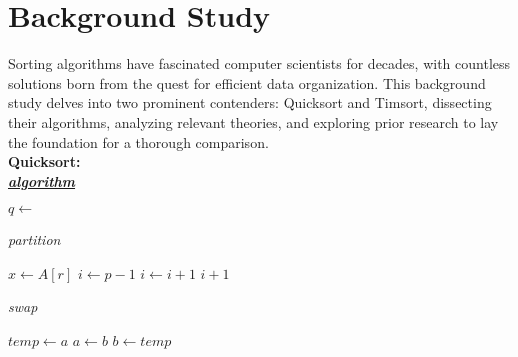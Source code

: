 \documentclass[a4paper,10pt,twocolumn]{article}
\begin{document}
\section{Background Study}
Sorting algorithms have fascinated computer scientists for decades, with countless solutions born from the quest for efficient data organization. This background study delves into two prominent contenders: Quicksort and Timsort, dissecting their algorithms, analyzing relevant theories, and exploring prior research to lay the foundation for a thorough comparison.
\\
\bf{Quicksort:}\\
\textit{\underline{algorithm}}
\begin{algorithmic}[1]
\State $q \gets$ 
\State {}
\State {}
\EndIf
\EndFunction
\end{algorithmic}
\textit{partition}
\begin{algorithmic}[1]
\State $x \gets A[r]$
\State $i \gets p-1$
\State $i \gets i+1$
\State {}
\EndIf
\EndFor
\State {}
\State \Return $i+1$
\EndFunction
\end{algorithmic}
\textit{swap}
\begin{algorithmic}[1]
\State $temp \gets a$
\State $a \gets b$
\State $b \gets temp$
\EndFunction
\end{algorithmic}
\end{document}
